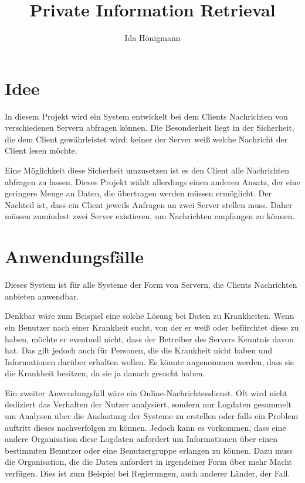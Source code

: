 \documentclass[]{article}
\title{Private Information Retrieval}
\author{Ida Hönigmann}
\begin{document}
\maketitle

\begin{abstract}

\end{abstract}

\section{Idee}
In diesem Projekt wird ein System entwickelt bei dem Clients Nachrichten von verschiedenen Servern abfragen können. Die Besonderheit liegt in der Sicherheit, die dem Client gewährleistet wird: keiner der Server weiß welche Nachricht der Client lesen möchte.

Eine Möglichkeit diese Sicherheit umzusetzen ist es den Client alle Nachrichten abfragen zu lassen. Dieses Projekt wählt allerdings einen anderen Ansatz, der eine geringere Menge an Daten, die übertragen werden müssen ermöglicht. Der Nachteil ist, dass ein Client jeweils Anfragen an zwei Server stellen muss. Daher müssen zumindest zwei Server existieren, um Nachrichten empfangen zu können.

\section{Anwendungsfälle}
Dieses System ist für alle Systeme der Form von Servern, die Clients Nachrichten anbieten anwendbar.

Denkbar wäre zum Beispiel eine solche Lösung bei Daten zu Krankheiten. Wenn ein Benutzer nach einer Krankheit sucht, von der er weiß oder befürchtet diese zu haben, möchte er eventuell nicht, dass der Betreiber des Servers Kenntnis davon hat. Das gilt jedoch auch für Personen, die die Krankheit nicht haben und Informationen darüber erhalten wollen. Es könnte angenommen werden, dass sie die Krankheit besitzen, da sie ja danach gesucht haben.

Ein zweiter Anwendungsfall wäre ein Online-Nachrichtendienst. Oft wird nicht dediziert das Verhalten der Nutzer analysiert, sondern nur Logdaten gesammelt um Analysen über die Auslastung der Systeme zu erstellen oder falls ein Problem auftritt dieses nachverfolgen zu können. Jedoch kann es vorkommen, dass eine andere Organisation diese Logdaten anfordert um Informationen über einen bestimmten Benutzer oder eine Benutzergruppe erlangen zu können. Dazu muss die Organisation, die die Daten anfordert in irgendeiner Form über mehr Macht verfügen. Dies ist zum Beispiel bei Regierungen, auch anderer Länder, der Fall.
\end{document}
